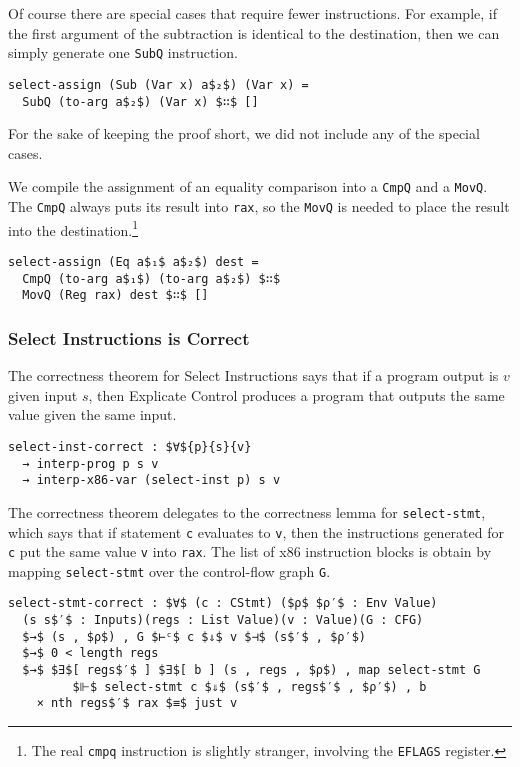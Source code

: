 \documentclass[sigplan,review,dvipsnames,screen,10pt]{acmart}
\begin{document}
\noindent Of course there are special cases that require fewer
instructions. For example, if the first argument of the subtraction is
identical to the destination, then we can simply generate one
\lstinline{SubQ} instruction. 

\begin{lstlisting}
select-assign (Sub (Var x) a$₂$) (Var x) = 
  SubQ (to-arg a$₂$) (Var x) $∷$ []
\end{lstlisting}

\noindent For the sake of keeping the proof short, we did not include
any of the special cases.

We compile the assignment of an equality comparison into a
\lstinline{CmpQ} and a \lstinline{MovQ}. The \lstinline{CmpQ} always
puts its result into \lstinline{rax}, so the \lstinline{MovQ} is
needed to place the result into the destination.\footnote{The real
\lstinline{cmpq} instruction is slightly stranger, involving
the \lstinline{EFLAGS} register.}

\begin{lstlisting}
select-assign (Eq a$₁$ a$₂$) dest =
  CmpQ (to-arg a$₁$) (to-arg a$₂$) $∷$
  MovQ (Reg rax) dest $∷$ []
\end{lstlisting}


\subsubsection{Select Instructions is Correct}

The correctness theorem for Select Instructions says that if a program
output is $v$ given input $s$, then Explicate Control produces a
program that outputs the same value given the same input.

\begin{lstlisting}
select-inst-correct : $∀${p}{s}{v}
  → interp-prog p s v
  → interp-x86-var (select-inst p) s v
\end{lstlisting}

The correctness theorem delegates to the correctness lemma for
\lstinline{select-stmt}, which says that if statement \lstinline{c}
evaluates to \lstinline{v}, then the instructions generated for
\lstinline{c} put the same value \lstinline{v} into \lstinline{rax}.
The list of x86 instruction blocks is obtain by mapping
\lstinline{select-stmt} over the control-flow graph \lstinline{G}.

\begin{lstlisting}
select-stmt-correct : $∀$ (c : CStmt) ($ρ$ $ρ′$ : Env Value)
  (s s$′$ : Inputs)(regs : List Value)(v : Value)(G : CFG)
  $→$ (s , $ρ$) , G $⊢ᶜ$ c $⇓$ v $⊣$ (s$′$ , $ρ′$)
  $→$ 0 < length regs
  $→$ $∃$[ regs$′$ ] $∃$[ b ] (s , regs , $ρ$) , map select-stmt G
         $⊩$ select-stmt c $⇓$ (s$′$ , regs$′$ , $ρ′$) , b
    × nth regs$′$ rax $≡$ just v
\end{lstlisting}
\end{document}
